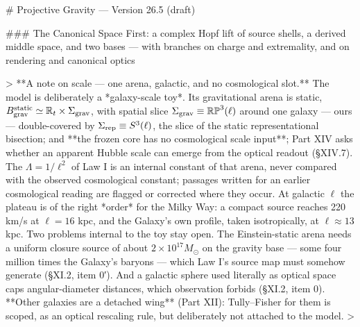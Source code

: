 # Projective Gravity — Version 26.5 (draft)

### The Canonical Space First: a complex Hopf lift of source shells, a derived middle space, and two bases — with branches on charge and extremality, and on rendering and canonical optics

> **A note on scale — one arena, galactic, and no cosmological slot.** The model is deliberately a *galaxy-scale toy*. Its gravitational arena is static, $B_{\rm grav}^{\rm static}\simeq\mathbb{R}_t\times\Sigma_{\rm grav}$, with spatial slice $\Sigma_{\rm grav}\equiv\mathbb{RP}^3(\ell)$ around one galaxy — ours — double-covered by $\Sigma_{\rm rep}\equiv S^3(\ell)$, the slice of the static representational bisection; and **the frozen core has no cosmological scale input**; Part XIV asks whether an apparent Hubble scale can emerge from the optical readout (§XIV.7). The $\Lambda = 1/\ell^2$ of Law I is an internal constant of that arena, never compared with the observed cosmological constant; passages written for an earlier cosmological reading are flagged or corrected where they occur. At galactic $\ell$ the plateau is of the right *order* for the Milky Way: a compact source reaches 220 km/s at $\ell = 16$ kpc, and the Galaxy's own profile, taken isotropically, at $\ell\approx13$ kpc. Two problems internal to the toy stay open. The Einstein-static arena needs a uniform closure source of about $2\times10^{17}M_\odot$ on the gravity base — some four million times the Galaxy's baryons — which Law I's source map must somehow generate (§XI.2, item 0′). And a galactic sphere used literally as optical space caps angular-diameter distances, which observation forbids (§XI.2, item 0). **Other galaxies are a detached wing** (Part XII): Tully–Fisher for them is scoped, as an optical rescaling rule, but deliberately not attached to the model.
>
